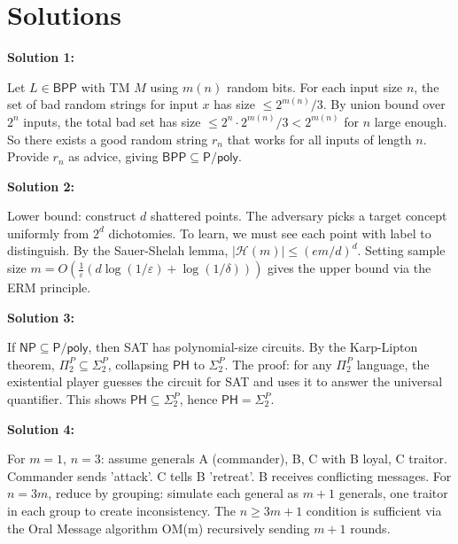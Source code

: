 \documentclass[12pt,a4paper]{exam}
\begin{document}
\newpage
\section*{Solutions}

\textbf{Solution 1:}

Let $L \in \mathsf{BPP}$ with TM $M$ using $m(n)$ random bits. For each input size $n$, the set of bad random strings for input $x$ has size $\leq 2^{m(n)}/3$. By union bound over $2^n$ inputs, the total bad set has size $\leq 2^n \cdot 2^{m(n)}/3 < 2^{m(n)}$ for $n$ large enough. So there exists a good random string $r_n$ that works for all inputs of length $n$. Provide $r_n$ as advice, giving $\mathsf{BPP} \subseteq \mathsf{P}/\mathsf{poly}$.

\vspace{0.5cm}

\textbf{Solution 2:}

Lower bound: construct $d$ shattered points. The adversary picks a target concept uniformly from $2^d$ dichotomies. To learn, we must see each point with label to distinguish. By the Sauer-Shelah lemma, $|\mathcal{H}(m)| \leq (em/d)^d$. Setting sample size $m = O(\frac{1}{\varepsilon}(d \log(1/\varepsilon) + \log(1/\delta)))$ gives the upper bound via the ERM principle.

\vspace{0.5cm}

\textbf{Solution 3:}

If $\mathsf{NP} \subseteq \mathsf{P}/\mathsf{poly}$, then SAT has polynomial-size circuits. By the Karp-Lipton theorem, $\Pi_2^P \subseteq \Sigma_2^P$, collapsing $\mathsf{PH}$ to $\Sigma_2^P$. The proof: for any $\Pi_2^P$ language, the existential player guesses the circuit for SAT and uses it to answer the universal quantifier. This shows $\mathsf{PH} \subseteq \Sigma_2^P$, hence $\mathsf{PH} = \Sigma_2^P$.

\vspace{0.5cm}

\textbf{Solution 4:}

For $m=1$, $n=3$: assume generals A (commander), B, C with B loyal, C traitor. Commander sends 'attack'. C tells B 'retreat'. B receives conflicting messages. For $n=3m$, reduce by grouping: simulate each general as $m+1$ generals, one traitor in each group to create inconsistency. The $n \geq 3m+1$ condition is sufficient via the Oral Message algorithm OM(m) recursively sending $m+1$ rounds.

\vspace{0.5cm}
\end{document}

